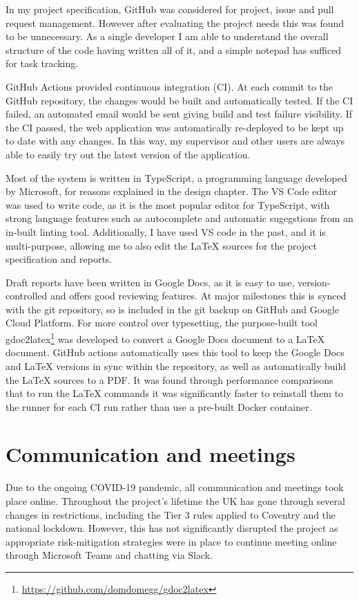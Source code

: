 \documentclass[a4paper,fleqn,oneside,12pt]{report}
\begin{document}
In my project specification, GitHub was considered for project, issue and pull request management. However after evaluating the project needs this was found to be unnecessary. As a single developer I am able to understand the overall structure of the code having written all of it, and a simple notepad has sufficed for task tracking.

GitHub Actions provided continuous integration (CI). At each commit to the GitHub repository, the changes would be built and automatically tested. If the CI failed, an automated email would be sent giving build and test failure visibility. If the CI passed, the web application was automatically re-deployed to be kept up to date with any changes. In this way, my supervisor and other users are always able to easily try out the latest version of the application.

Most of the system is written in TypeScript, a programming language developed by Microsoft, for reasons explained in the design chapter. The VS Code editor was used to write code, as it is the most popular editor for TypeScript, with strong language features such as autocomplete and automatic sugegstions from an in-built linting tool. Additionally, I have used VS code in the past, and it is multi-purpose, allowing me to also edit the LaTeX sources for the project specification and reports.

Draft reports have been written in Google Docs, as it is easy to use, version-controlled and offers good reviewing features. At major milestones this is synced with the git repository, so is included in the git backup on GitHub and Google Cloud Platform. For more control over typesetting, the purpose-built tool gdoc2latex\footnote{\href{https://github.com/domdomegg/gdoc2latex}{https://github.com/domdomegg/gdoc2latex}} was developed to convert a Google Docs document to a LaTeX document. GitHub actions automatically uses this tool to keep the Google Docs and LaTeX versions in sync within the repository, as well as automatically build the LaTeX sources to a PDF. It was found through performance comparisons that to run the LaTeX commands it was significantly faster to reinstall them to the runner for each CI run rather than use a pre-built Docker container.
\section{Communication and meetings}\label{id:h.k8ippxnoat7q}
Due to the ongoing COVID-19 pandemic, all communication and meetings took place online. Throughout the project’s lifetime the UK has gone through several changes in restrictions, including the Tier 3 rules applied to Coventry and the national lockdown. However, this has not significantly disrupted the project as appropriate risk-mitigation strategies were in place to continue meeting online through Microsoft Teams and chatting via Slack.
\end{document}
